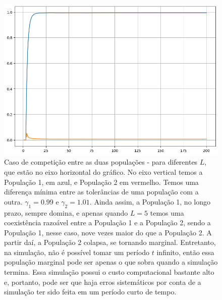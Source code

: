 \documentclass{article}
\begin{document}
	\begin{figure}[h]
		\centering
		\includegraphics[scale=0.45]{Two-P-20-Population-Competition-Area-Time-Both}
		\caption{Caso de competição entre as duas populações - para diferentes $L$, que estão no eixo horizontal do gráfico. No eixo vertical temos a População 1, em azul, e População 2 em vermelho. Temos uma diferença mínima entre as tolerâncias de uma população com a outra. $\gamma_1 = 0.99$ e $\gamma_2 = 1.01$. Ainda assim, a População 1, no longo prazo, sempre domina, e apenas quando $L = 5$ temos uma coexistência razoável entre a População 1 e a População 2, sendo a População 1, nesse caso, nove vezes maior do que a População 2. A partir daí, a População 2 colapsa, se tornando marginal. Entretanto, na simulação, não é possível tomar um período $t$ infinito, então essa população marginal pode ser apenas o que sobra quando a simulação termina. Essa simulação possui o custo computacional bastante alto e, portanto, pode ser que haja erros sistemáticos por conta de a simulação ter sido feita em um período curto de tempo.}
		\label{fig:Two-P-20-Population-Competition-Area-Time-Both}
	\end{figure}	
\end{document}

